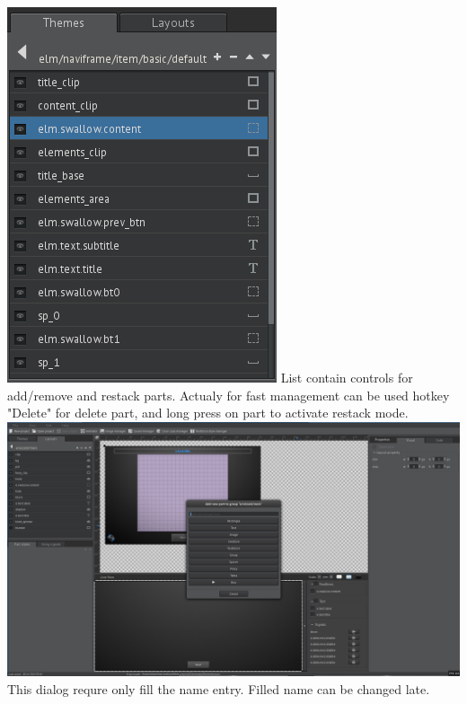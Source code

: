 \documentclass[titlepage,oneside,11pt]{book}
\begin{document}
\includegraphics[scale=0.5]{images/part_list.png}\newline
List contain controls for add/remove and restack parts. Actualy for fast management can be used hotkey "{}Delete"{} for delete part, and long press on part to activate restack mode.\newline
\includegraphics[scale=0.2]{images/part_add_dialog.jpg}\newline
This dialog requre  only fill the name entry. Filled name can be changed late.
\end{document}
